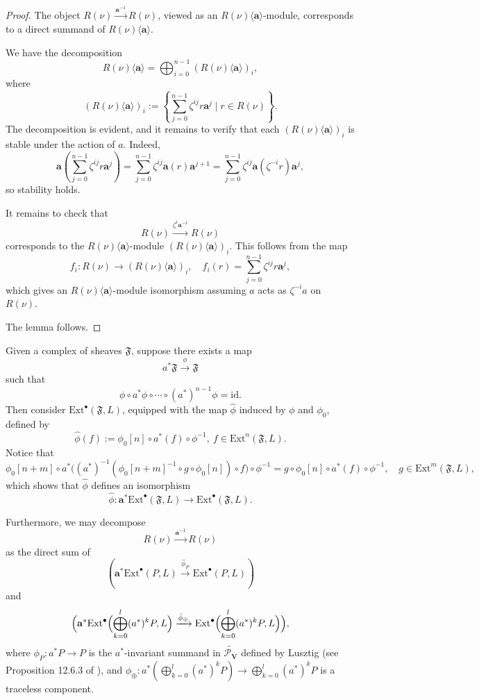 \documentclass[10pt,a4paper]{amsart}
\begin{document}
\begin{proof}
The object $R(\nu) \xrightarrow{\mathbf{a}^{-1}} R(\nu)$, viewed as an $R(\nu)\langle\mathbf{a}\rangle$-module, corresponds to a direct summand of $R(\nu)\langle\mathbf{a}\rangle$.

We have the decomposition
\[
R(\nu)\langle\mathbf{a}\rangle = \bigoplus_{i=0}^{n-1} (R(\nu)\langle\mathbf{a}\rangle)_i,
\]
where
\[
(R(\nu)\langle\mathbf{a}\rangle)_i := \left\{ \sum_{j=0}^{n-1} \zeta^{ij} r \mathbf{a}^j \mid r \in R(\nu) \right\}.
\]
The decomposition is evident, and it remains to verify that each $(R(\nu)\langle\mathbf{a}\rangle)_i$ is stable under the action of $a$. Indeed,
\[
\mathbf{a} \left( \sum_{j=0}^{n-1} \zeta^{ij} r \mathbf{a}^j \right)
= \sum_{j=0}^{n-1} \zeta^{ij} \mathbf{a}(r) \mathbf{a}^{j+1}
= \sum_{j=0}^{n-1} \zeta^{ij} \mathbf{a}(\zeta^{-i} r) \mathbf{a}^j,
\]
so stability holds.

It remains to check that
\[
R(\nu) \xrightarrow{\zeta^{i} \mathbf{a}^{-1}} R(\nu)
\]
corresponds to the $R(\nu)\langle\mathbf{a}\rangle$-module $(R(\nu)\langle\mathbf{a}\rangle)_i$. This follows from the map
\[
f_i : R(\nu) \to (R(\nu)\langle\mathbf{a}\rangle)_i, \quad f_i(r) = \sum_{j=0}^{n-1} \zeta^{ij} r \mathbf{a}^j,
\]
which gives an $R(\nu)\langle\mathbf{a}\rangle$-module isomorphism assuming $a$ acts as $\zeta^{-i}a$ on $R(\nu).$

The lemma follows.
\end{proof}
Given a complex of sheaves $\mathfrak{F}$, suppose there exists a map
\[
a^* \mathfrak{F} \xrightarrow{\phi} \mathfrak{F}
\]
such that
\[
\phi \circ a^* \phi \circ \cdots \circ (a^*)^{n-1} \phi = \mathrm{id}.
\]
Then consider $\mathrm{Ext}^{\bullet}(\mathfrak{F}, L)$, equipped with the map $\hat{\phi}$ induced by $\phi$ and $\phi_0$, defined by
\[
\hat{\phi}(f) := \phi_0[n] \circ a^*(f) \circ \phi^{-1},\ f\in \mathrm{Ext}^{n}(\mathfrak{F}, L).
\]
Notice that
\[
\phi_0[n+m] \circ a^*\bigl( (a^*)^{-1}(\phi_0[n+m]^{-1} \circ g \circ \phi_0[n]) \circ f \bigr) \circ \phi^{-1}
= g \circ \phi_0[n] \circ a^*(f) \circ \phi^{-1},\quad g\in \mathrm{Ext}^{m}(\mathfrak{F}, L),
\]
which shows that $\hat{\phi}$ defines an isomorphism
\[
\hat{\phi} : \mathbf{a}^* \mathrm{Ext}^{\bullet}(\mathfrak{F}, L) \to \mathrm{Ext}^{\bullet}(\mathfrak{F}, L).
\]

Furthermore, we may decompose
\[
R(\nu) \xrightarrow{\mathbf{a}^{-1}} R(\nu)
\]
as the direct sum of
\[
(\mathbf{a}^* \mathrm{Ext}^{\bullet}(P, L) \xrightarrow{\hat{\phi}_P} \mathrm{Ext}^{\bullet}(P, L))
\]
and
\[
\Bigl( \mathbf{a}^* \mathrm{Ext}^{\bullet}\Bigl( \bigoplus_{k=0}^{l} (a^*)^k P, L \Bigr) 
\xrightarrow{\hat{\phi}_{\oplus}} 
\mathrm{Ext}^{\bullet}\Bigl( \bigoplus_{k=0}^{l} (a^*)^k P, L \Bigr) \Bigr),
\]
where $\phi_P : a^* P \to P$ is the $a^*$-invariant summand in $\widetilde{\mathcal{P}_{\mathbf{V}}}$ defined by Lusztig (see Proposition 12.6.3 of \cite{lusztig2010introduction}), and $\phi_{\oplus} : a^*(\bigoplus_{k=0}^{l} (a^*)^k P) \to \bigoplus_{k=0}^{l} (a^*)^k P$ is a traceless component.
\end{document}
